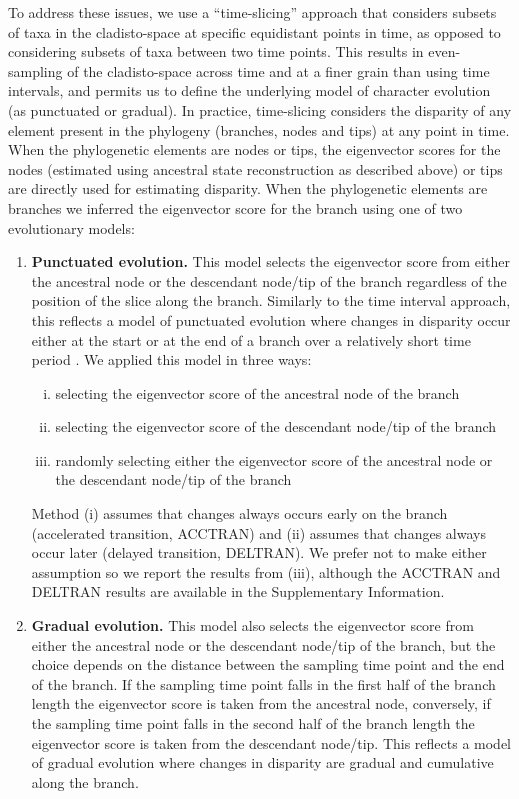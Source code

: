 \documentclass[12pt,letterpaper]{article}
\begin{document}
To address these issues, we use a ``time-slicing'' approach that considers subsets of taxa in the cladisto-space at specific equidistant points in time, as opposed to considering subsets of taxa between two time points.
This results in even-sampling of the cladisto-space across time and at a finer grain than using time intervals, and permits us to define the underlying model of character evolution (as punctuated or gradual).  
In practice, time-slicing considers the disparity of any element present in the phylogeny (branches, nodes and tips) at any point in time.
When the phylogenetic elements are nodes or tips, the eigenvector scores for the nodes (estimated using ancestral state reconstruction as described above) or tips are directly used for estimating disparity.
When the phylogenetic elements are branches we inferred the eigenvector score for the branch using one of two evolutionary models:
\begin{enumerate}
    \item{\textbf{Punctuated evolution.}} 
    This model selects the eigenvector score from either the ancestral node or the descendant node/tip of the branch regardless of the position of the slice along the branch. 
    Similarly to the time interval approach, this reflects a model of punctuated evolution where changes in disparity occur either at the start or at the end of a branch over a relatively short time period \citep{Gould1977}.
    We applied this model in three ways: 
    \begin{enumerate}[(i)]
      \item selecting the eigenvector score of the ancestral node of the branch
      \item selecting the eigenvector score of the descendant node/tip of the branch
      \item randomly selecting either the eigenvector score of the ancestral node or the descendant node/tip of the branch
    \end{enumerate}
    Method (i) assumes that changes always occurs early on the branch (accelerated transition, ACCTRAN) and (ii) assumes that changes always occur later (delayed transition, DELTRAN).
    We prefer not to make either assumption so we report the results from (iii), although the ACCTRAN and DELTRAN results are available in the Supplementary Information. %
    \item{\textbf{Gradual evolution.}}
    This model also selects the eigenvector score from either the ancestral node or the descendant node/tip of the branch, but the choice depends on the distance between the sampling time point and the end of the branch.
    If the sampling time point falls in the first half of the branch length the eigenvector score is taken from the ancestral node, conversely, if the sampling time point falls in the second half of the branch length the eigenvector score is taken from the descendant node/tip.
    This reflects a model of gradual evolution where changes in disparity are gradual and cumulative along the branch.
\end{enumerate}
\end{document}
